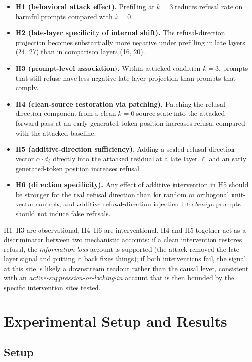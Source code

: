 \documentclass{article}
\begin{document}
\begin{itemize}
\item \textbf{H1 (behavioral attack effect).} Prefilling at $k=3$
  reduces refusal rate on harmful prompts compared with $k=0$.
\item \textbf{H2 (late-layer specificity of internal shift).} The
  refusal-direction projection becomes substantially more negative under
  prefilling in late layers (24, 27) than in comparison layers (16, 20).
\item \textbf{H3 (prompt-level association).} Within attacked condition
  $k=3$, prompts that still refuse have less-negative late-layer
  projection than prompts that comply.
\item \textbf{H4 (clean-source restoration via patching).} Patching the
  refusal-direction component from a clean $k=0$ source state into the
  attacked forward pass at an early generated-token position increases
  refusal compared with the attacked baseline.
\item \textbf{H5 (additive-direction sufficiency).} Adding a scaled
  refusal-direction vector $\alpha\cdot\hat{d}_\ell$ directly into the
  attacked residual at a late layer $\ell$ and an early generated-token
  position increases refusal.
\item \textbf{H6 (direction specificity).} Any effect of additive
  intervention in H5 should be stronger for the real refusal direction
  than for random or orthogonal unit-vector controls, and additive
  refusal-direction injection into \emph{benign} prompts should not
  induce false refusals.
\end{itemize}

H1--H3 are observational; H4--H6 are interventional. H4 and H5 together
act as a discriminator between two mechanistic accounts: if a clean
intervention restores refusal, the \emph{information-loss} account is
supported (the attack removed the late-layer signal and putting it back
fixes things); if both interventions fail, the signal at this site is
likely a downstream readout rather than the causal lever, consistent with
an \emph{active-suppression-or-locking-in} account that is then bounded
by the specific intervention sites tested.

\section{Experimental Setup and Results}
\label{sec:results}

\subsection{Setup}
\label{sec:setup}
\end{document}
